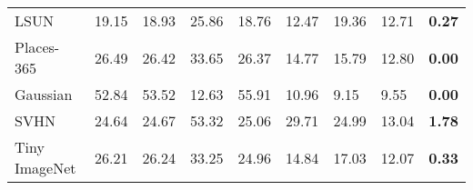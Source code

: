 \documentclass[accepted]{uai2021} \pdfoutput=1
\begin{document}
\begin{table*}[htbp]
{\begin{tabular}{lllclllll}
	\multicolumn{1}{l|}{LSUN}                & 19.15                       & 18.93                       & \multicolumn{1}{l}{25.86}                                     & 18.76                                                                       & 12.47                     & 19.36                                                                        & 12.71                    & \textbf{0.27}           \\
	\multicolumn{1}{l|}{Places-365}          & 26.49                       & 26.42                       & \multicolumn{1}{l}{33.65}                                     & 26.37                                                                       & 14.77                     & 15.79                                                                        & 12.80                    & \textbf{0.00}           \\
	\multicolumn{1}{l|}{Gaussian}            & 52.84                      & 53.52                      & \multicolumn{1}{l}{12.63}                                     & 55.91                                                                      & 10.96                    & 9.15                                                                         & 9.55                     & \textbf{0.00}           \\
	\multicolumn{1}{l|}{SVHN}                & 24.64                       & 24.67                       & \multicolumn{1}{l}{53.32}                                    & 25.06                                                                       & 29.71                    & 24.99                                                                        & 13.04                    & \textbf{1.78}           \\
	\multicolumn{1}{l|}{Tiny ImageNet}       & 26.21                      & 26.24                      & \multicolumn{1}{l}{33.25}                                    & 24.96                                                                       & 14.84                     & 17.03                                                                        & 12.07                    & \textbf{0.33}           \\ \hline
	
	
	

\end{tabular}}
\end{table*}
\end{document}
